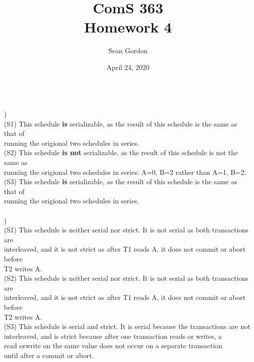 \documentclass[12pt]{article}
\title{ComS 363\\Homework 4}
\author{Sean Gordon}
\date{April 24, 2020}
\begin{document}
\maketitle


\noindent \hrulefill \\[-.4em]



)\\
\indent (S1) This schedule \textbf{is} serializable, as the result of this schedule is the same as that of \\
\indent \indent running the origional two schedules in series.\\

\indent (S2) This schedule \textbf{is not} serializable, as the result of this schedule is not the same as \\
\indent \indent running the origional two schedules in series: A=0, B=2 rather than A=1, B=2.\\

\indent (S3) This schedule \textbf{is} serializable, as the result of this schedule is the same as that of \\
\indent \indent running the origional two schedules in series.\\[-.4em]


\noindent \hrulefill \\[-.4em]


)\\
\indent (S1) This schedule is neither serial nor strict. It is not serial as both transactions are \\
\indent \indent interleaved, and it is not strict as after T1 reads A, it does not commit or abort before\\
\indent \indent T2 writes A.\\

\indent (S2) This schedule is neither serial nor strict. It is not serial as both transactions are \\
\indent \indent interleaved, and it is not strict as after T1 reads A, it does not commit or abort before\\
\indent \indent T2 writes A.\\

\indent (S3) This schedule is serial and strict. It is serial because the transactions are not \\
\indent \indent interleaved, and is strict because after one transaction reads or writes, a\\
\indent \indent read orwrite on the same value does not occur on a separate transaction\\
\indent \indent until after a commit or abort.\\
\end{document}
